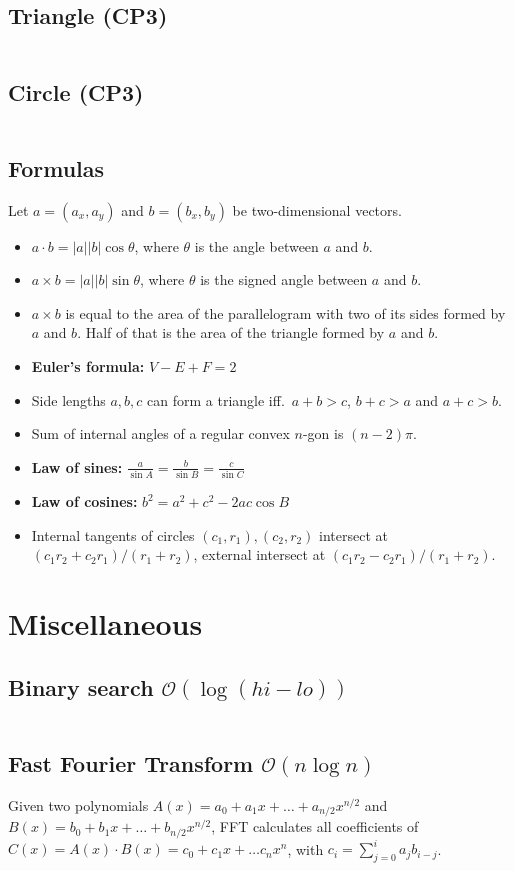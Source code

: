 \documentclass[9pt,a4paper,landscape,oneside]{amsart}
\newcommand{\mintedstyle}[2]{\inputminted{#1}{code/#2}}
\newcommand{\code}[1]{\mintedstyle{cpp}{#1}}
\newenvironment{myitemize}
{\begin{itemize}[leftmargin=.3cm]
	\setlength{\itemsep}{0pt}
	\setlength{\parskip}{0pt}
	\setlength{\parsep}{0pt}     }
{ \end{itemize}                  }
\begin{document}
\begin{multicols*}{3}
\subsection{Triangle (CP3)}
\code{geometry/CP/triangles.cpp}
\subsection{Circle (CP3)}
\code{geometry/CP/circles.cpp}

\subsection{Formulas}
Let $a = (a_x, a_y)$ and $b = (b_x, b_y)$ be two-dimensional vectors.
\begin{myitemize}
	\item $a\cdot b = |a||b|\cos{\theta}$, where $\theta$ is the angle
		between $a$ and $b$.
	\item $a\times b = |a||b|\sin{\theta}$, where $\theta$ is the
		signed angle between $a$ and $b$.
	\item $a\times b$ is equal to the area of the parallelogram with
		two of its sides formed by $a$ and $b$. Half of that is the
		area of the triangle formed by $a$ and $b$.
	\item \textbf{Euler's formula:} $V - E + F = 2$
	\item Side lengths $a,b,c$ can form a triangle iff.\ $a+b>c$, $b+c>a$ and $a+c>b$.
	\item Sum of internal angles of a regular convex $n$-gon is $(n-2)\pi$.
	\item \textbf{Law of sines:} $\frac{a}{\sin A} = \frac{b}{\sin B} = \frac{c}{\sin C}$
	\item \textbf{Law of cosines:} $b^2 = a^2 + c^2 - 2ac\cos B$
	\item Internal tangents of circles $(c_1,r_1), (c_2,r_2)$ intersect at $(c_1r_2+c_2r_1)/(r_1+r_2)$, external intersect at $(c_1r_2-c_2r_1)/(r_1+r_2)$.
\end{myitemize}

\section{Miscellaneous}
\subsection{Binary search $\mathcal{O}(\log (hi - lo))$}
\code{binary_search.cpp}

\subsection{Fast Fourier Transform $\mathcal{O}(n \log n)$}
Given two polynomials $A(x) = a_0 + a_1 x + \dots + a_{n/2} x^{n/2}$ and $B(x) = b_0 + b_1 x + \dots + b_{n/2} x^{n/2}$, FFT calculates all coefficients of $C(x) = A(x) \cdot B(x) = c_0 + c_1 x + \dots c_{n} x^{n}$, with $c_i = \sum_{j=0}^{i} a_j b_{i-j}$.
\code{math/fft.cpp}


\end{multicols*}
\end{document}
